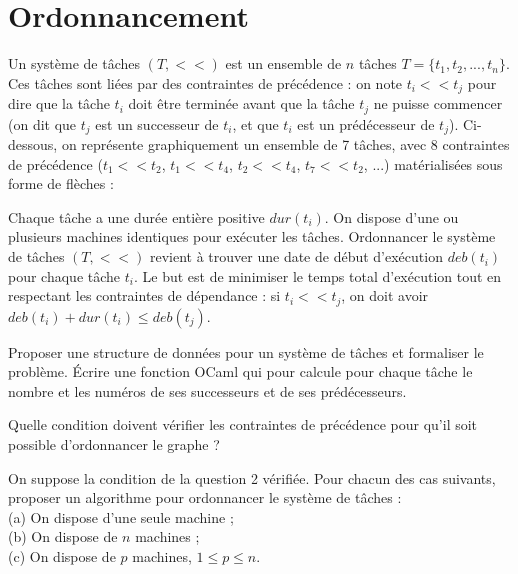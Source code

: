 \renewcommand{\SourceFile}{5-graphes/src/5-6.ml}

\section{Ordonnancement}

Un système de tâches $(T,<<)$ est un ensemble de $n$ tâches $T=\{t_1,t_2,...,t_n\}$. Ces tâches sont liées par des contraintes de précédence : on note $t_i << t_j$ pour dire que la tâche $t_i$ doit être terminée avant que la tâche $t_j$ ne puisse commencer (on dit que $t_j$ est un successeur de $t_i$, et que $t_i$ est un prédécesseur de $t_j$). Ci-dessous, on représente graphiquement un ensemble de 7 tâches, avec 8 contraintes de précédence ($t_1<<t_2$, $t_1<<t_4$, $t_2<<t_4$, $t_7<<t_2$, ...) matérialisées sous forme de flèches :
\medskip

\medskip

Chaque tâche a une durée entière positive $dur(t_i)$. On dispose d'une ou plusieurs machines identiques pour exécuter les tâches. Ordonnancer le système de tâches $(T,<<)$ revient à trouver une date de début d'exécution $deb(t_i)$ pour chaque tâche $t_i$. Le but est de minimiser le temps total d'exécution tout en respectant les contraintes de dépendance : si $t_i << t_j$, on doit avoir $deb(t_i) + dur(t_i) \leq deb(t_j)$.

\Q
Proposer une structure de données pour un système de tâches et formaliser le problème. Écrire une fonction OCaml qui pour calcule pour chaque tâche le nombre et les numéros de ses successeurs et de ses prédécesseurs.

\Q
Quelle condition doivent vérifier les contraintes de précédence pour qu'il soit possible d'ordonnancer le graphe ?

\Q
On suppose la condition de la question 2 vérifiée. Pour chacun des cas suivants, proposer un algorithme pour ordonnancer le système de tâches :\\
(a) On dispose d'une seule machine ;\\
(b) On dispose de $n$ machines ;\\
(c) On dispose de $p$ machines, $1 \leq p \leq n$.

